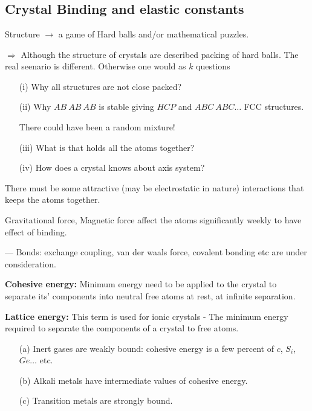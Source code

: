 \chapter{}\label{lec15}

\section*{Crystal Binding and elastic constants}

Structure $\to$ a game of Hard balls and/or mathematical puzzles.

$\Rightarrow$ Although the structure of crystals are described packing of hard balls. The real seenario is different. Otherwise one would as $k$ questions
\begin{itemize}
\item[(i)] Why all structures are not close packed?

\item[(ii)] Why $AB \ AB\ AB$ is stable giving $HCP$ and $ABC \ ABC\ldots$ FCC structures.

There could have been a random mixture!

\item[(iii)] What is that holds all the atoms together?

\item[(iv)] How does a crystal knows about axis system? 
\end{itemize}

There must be some attractive (may be electrostatic in nature) interactions that keeps the atoms together.

Gravitational force, Magnetic force affect the atoms significantly weekly to have effect of binding.

--- Bonds: exchange coupling, van der waals force, covalent bonding etc are under consideration.

\noindent
{\bf Cohesive energy:} Minimum energy need to be applied to the crystal to separate its' components into neutral free atoms at rest, at infinite separation.

\noindent
{\bf Lattice energy:} This term is used for ionic crystals - The minimum energy required to separate the components of a crystal to free atoms.
\begin{itemize}
\item[(a)] Inert gases are weakly bound: cohesive energy is a few percent of $c$, $S_{i}$, $Ge\ldots$ etc.

\item[(b)] Alkali metals have intermediate values of cohesive energy.

\item[(c)] Transition metals are strongly bound.
\end{itemize}

